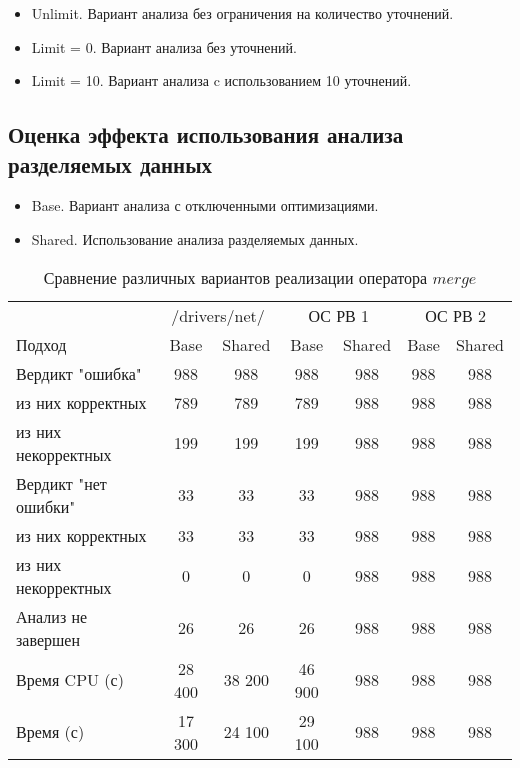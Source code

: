 \begin{itemize}
\item Unlimit. Вариант анализа без ограничения на количество уточнений.
\item Limit = 0. Вариант анализа без уточнений.
\item Limit = 10. Вариант анализа c использованием 10 уточнений.
\end{itemize}


\subsection{Оценка эффекта использования анализа разделяемых данных}

\begin{itemize}
\item Base. Вариант анализа с отключенными оптимизациями.
\item Shared. Использование анализа разделяемых данных.
\end{itemize}


\begin{center}
  \begin{table}[h]\footnotesize
  	\label{table-drivers-lock-refinement}
    \caption{Сравнение различных вариантов реализации оператора $merge$}
    \begin{tabular}{ | l | c | c | c | c | c | c |}
      \hline
      		& 		 \multicolumn{2}{|c|}{/drivers/net/} & 		 \multicolumn{2}{|c|}{ОС РВ 1} & 		 \multicolumn{2}{|c|}{ОС РВ 2} \\
      Подход         				& Base 	& Shared 	& Base  & Shared 	& Base   & Shared 	\\ \hline
      Вердикт "ошибка" 				& 988   & 988       & 988   & 988   	& 988    & 988  	\\ 
  \hspace{0.5cm} из них корректных 	& 789 	& 789 		& 789   & 988  		& 988    & 988 		\\ 
  \hspace{0.5cm} из них некорректных & 199 	& 199 		& 199   & 988   	& 988    & 988  	\\ \hline
      Вердикт "нет ошибки"  		& 33    & 33        & 33   	& 988  		& 988    & 988   	\\ 
  \hspace{0.5cm} из них корректных 	& 33 	& 33    	& 33   	& 988   	& 988    & 988  	\\
  \hspace{0.5cm} из них некорректных & 0 	& 0    		& 0    	& 988  		& 988    & 988 		\\ \hline
      Анализ не завершен       		& 26    & 26        & 26   	& 988   	& 988    & 988		\\ \hline
      Время CPU (с)   				& 28 400 & 38 200   & 46 900 & 988   	& 988    & 988		\\ 
      Время (с) 		 			& 17 300 & 24 100   & 29 100 & 988  	& 988    & 988   	\\
      \hline
    \end{tabular}
  \end{table}
\end{center}

